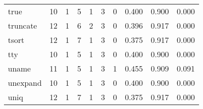 \begin{longtable}{lp{2.0cm}p{2.0cm}p{2.0cm}p{2.0cm}p{2.0cm}p{2.0cm}p{2.0cm}p{2.0cm}p{2.0cm}}
true      &                     10 &                                             1 &                                            5 &                                           1 &                                            3 &                                          0 &                                0.400 &                                  0.900 &                                0.000 \\
truncate  &                     12 &                                             1 &                                            6 &                                           2 &                                            3 &                                          0 &                                0.396 &                                  0.917 &                                0.000 \\
tsort     &                     12 &                                             1 &                                            7 &                                           1 &                                            3 &                                          0 &                                0.375 &                                  0.917 &                                0.000 \\
tty       &                     10 &                                             1 &                                            5 &                                           1 &                                            3 &                                          0 &                                0.400 &                                  0.900 &                                0.000 \\
uname     &                     11 &                                             1 &                                            5 &                                           1 &                                            3 &                                          1 &                                0.455 &                                  0.909 &                                0.091 \\
unexpand  &                     10 &                                             1 &                                            5 &                                           1 &                                            3 &                                          0 &                                0.400 &                                  0.900 &                                0.000 \\
uniq      &                     12 &                                             1 &                                            7 &                                           1 &                                            3 &                                          0 &                                0.375 &                                  0.917 &                                0.000 \\

\end{longtable}

